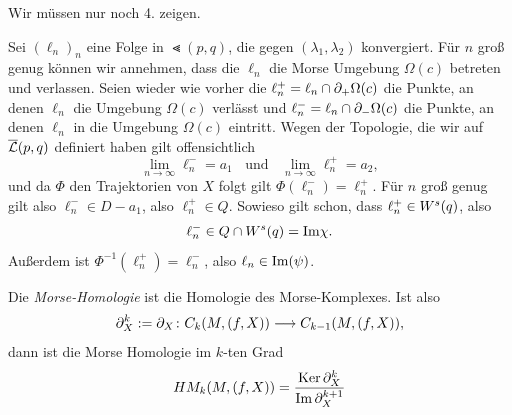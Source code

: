 \begin{bigproof}
    Wir müssen nur noch 4. zeigen.

    Sei $(\ell_n)_n$ eine Folge in $\Lt (p, q)$, die gegen $(\lambda_1, \lambda_2)$ konvergiert. 
    Für $n$ groß genug können wir annehmen, dass die $\ell_n$ die Morse Umgebung $\Omega (c)$ betreten 
    und verlassen. Seien wieder wie vorher die $\ell_n^+ = \ell_n \cap { \partial }_+ \Omega (c)$ die Punkte, 
    an denen $\ell_n$ die Umgebung $\Omega (c)$ verlässt und $\ell_n^- = \ell_n \cap { \partial }_- \Omega (c)$
    die Punkte, an denen $\ell_n$ in die Umgebung $\Omega (c)$ eintritt. Wegen der Topologie, die wir 
    auf ${\overline{\mathcal{L}} }(p, q)$ definiert haben gilt offensichtlich
    \[ \lim_{n \to \infty} \ell_n^- = a_1 \; \; \text{ und } \; \; \lim_{n \to \infty} \ell_n^+ = a_2 , \]
    und da $\Phi$ den Trajektorien von $X$ folgt gilt $\Phi(\ell_n^-) = \ell_n^+$.
    Für $n$ groß genug gilt also $\ell_n^- \in D - a_1$, also $\ell_n^+ \in Q$. Sowieso gilt schon, dass
    $\ell_n^+ \in { W^s } (q)$, also 
    \[ \ell_n^- \in Q \cap { W^s } (q) = { \operatorname{Im} } \chi . \]
    Außerdem ist $\Phi^{-1}(\ell_n^+) = \ell_n^-$, also $\ell_n \in { \operatorname{Im} } (\psi)$.
\end{bigproof}

\begin{definition}
    \label{def: morse-homologie}
    Die \textit{Morse-Homologie} ist die Homologie des Morse-Komplexes. Ist also
    \[ { \partial }_X^k := { \partial }_X \colon C_k (M, (f, X)) \longrightarrow C_{k - 1} (M, (f, X)), \]
    dann ist die Morse Homologie im $k$-ten Grad 
    \[ HM_k (M, (f, X)) = \frac{{ \operatorname{Ker} } \, { \partial }_X^k}{{ \operatorname{Im} } \, { \partial }_X^{k + 1}} \]
\end{definition}


